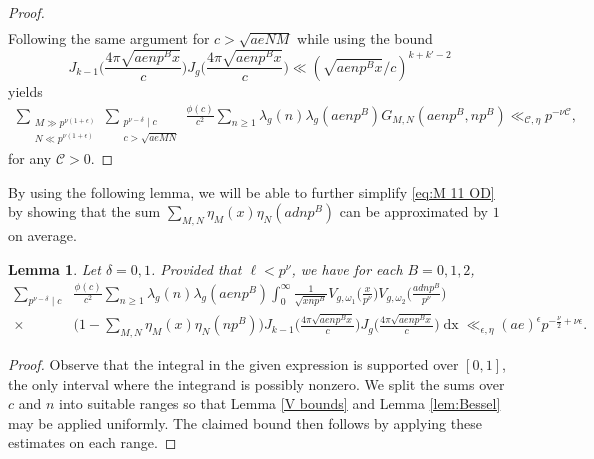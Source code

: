 \documentclass[12pt]{amsart}
\theoremstyle{plain}
\newtheorem{lem}{Lemma}[subsection]
\theoremstyle{definition}
\begin{document}
\begin{proof}
\begin{align*}
     \end{align*}       
Following the same argument for $c > \sqrt{aeNM}$ while using the bound  
\[
J_{k-1}\Big(\frac{4\pi \sqrt{aenp^B x}}{c}\Big)J_{g}\Big(\frac{4\pi \sqrt{aenp^B x}}{c}\Big)
  \ll\left(\sqrt{aenp^B x}/c\right)^{k+k'-2}
  \]
  yields  
  \begin{align*}
  \sum_{\substack{M \gg p^{\nu(1+\epsilon)}\\N\ll p^{\nu(1+\epsilon)}}}   \sum_{\substack{p^{\nu-\delta} \mid c\\c>\sqrt{aeMN}}} \frac{\phi(c)}{c^2} 
    \sum_{n\geq 1}
    \lambda_g(n) \lambda_g(aenp^B) G_{M,N}(aenp^B, np^B)   \ll_{\mathcal{C},\eta} p^{-\nu \mathcal{C}},
     \end{align*}   
 for any $\mathcal{C}>0$.
  \end{proof}

By using the following lemma, we will be able to further simplify \eqref{eq:M 11 OD} by showing that the sum $\sum_{M, N}  \eta_M(x) \eta_N(adnp^B) $ can be approximated by $1$ on average.





\begin{lem}\label{lem:remove-dyadic}
Let $\delta= 0, 1$. Provided that $\ell< p^{\nu}$, we have for each $B=0, 1, 2$, 
    \begin{align*}
     \sum_{p^{\nu-\delta}  \mid c}
    &\frac{\phi(c)}{c^2}
    \sum_{n\geq 1}
    \lambda_g(n)\lambda_g(aenp^B) 
     \int_0^\infty 
    \frac{1}{\sqrt{xnp^B}} 
    V_{g, \omega_1}\Big(\tfrac{x}{p^\nu }\Big) 
    V_{g, \omega_2}\Big(\tfrac{adnp^B}{p^\nu }\Big)
    \\
    \times &
    \Big(1-\sum_{M, N}  \eta_M(x) \eta_N(np^B) \Big)
    J_{k-1}\Big(\tfrac{4\pi\sqrt{aenp^Bx}}{c}\Big)
    J_g\Big(\tfrac{4\pi\sqrt{aenp^Bx}}{c} \Big) 
    \mathop{dx} 
    \ll_{\epsilon, \eta}  (ae)^{\epsilon}p^{-\frac{\nu}{2}+\nu\epsilon}  .
    \end{align*}
\end{lem}



\begin{proof}
Observe that the integral in the given expression is supported over $[0, 1]$, the only interval where the integrand is possibly nonzero. We split the sums over $c$ and $n$ into suitable ranges so that Lemma \ref{V bounds} and Lemma \ref{lem:Bessel} may be applied uniformly. The claimed bound then follows by applying these estimates on each range.   
\end{proof}
\end{document}
